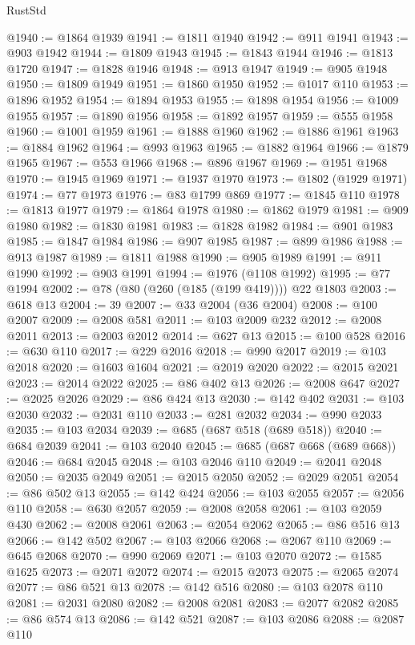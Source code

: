 \begin{lexlean}{RustStd}
\begin{coremodule}
@1940 := @1864 @1939
@1941 := @1811 @1940
@1942 := @911 @1941
@1943 := @903 @1942
@1944 := @1809 @1943
@1945 := @1843 @1944
@1946 := @1813 @1720
@1947 := @1828 @1946
@1948 := @913 @1947
@1949 := @905 @1948
@1950 := @1809 @1949
@1951 := @1860 @1950
@1952 := @1017 @110
@1953 := @1896 @1952
@1954 := @1894 @1953
@1955 := @1898 @1954
@1956 := @1009 @1955
@1957 := @1890 @1956
@1958 := @1892 @1957
@1959 := @555 @1958
@1960 := @1001 @1959
@1961 := @1888 @1960
@1962 := @1886 @1961
@1963 := @1884 @1962
@1964 := @993 @1963
@1965 := @1882 @1964
@1966 := @1879 @1965
@1967 := @553 @1966
@1968 := @896 @1967
@1969 := @1951 @1968
@1970 := @1945 @1969
@1971 := @1937 @1970
@1973 := @1802 (@1929 @1971)
@1974 := @77 @1973
@1976 := @83 @1799 @869
@1977 := @1845 @110
@1978 := @1813 @1977
@1979 := @1864 @1978
@1980 := @1862 @1979
@1981 := @909 @1980
@1982 := @1830 @1981
@1983 := @1828 @1982
@1984 := @901 @1983
@1985 := @1847 @1984
@1986 := @907 @1985
@1987 := @899 @1986
@1988 := @913 @1987
@1989 := @1811 @1988
@1990 := @905 @1989
@1991 := @911 @1990
@1992 := @903 @1991
@1994 := @1976 (@1108 @1992)
@1995 := @77 @1994
@2002 := @78 (@80 (@260 (@185 (@199 @419)))) @22 @1803
@2003 := @618 @13
@2004 := 39
@2007 := @33 @2004 (@36 @2004)
@2008 := @100 @2007
@2009 := @2008 @581
@2011 := @103 @2009 @232
@2012 := @2008 @2011
@2013 := @2003 @2012
@2014 := @627 @13
@2015 := @100 @528
@2016 := @630 @110
@2017 := @229 @2016
@2018 := @990 @2017
@2019 := @103 @2018
@2020 := @1603 @1604
@2021 := @2019 @2020
@2022 := @2015 @2021
@2023 := @2014 @2022
@2025 := @86 @402 @13
@2026 := @2008 @647
@2027 := @2025 @2026
@2029 := @86 @424 @13
@2030 := @142 @402
@2031 := @103 @2030
@2032 := @2031 @110
@2033 := @281 @2032
@2034 := @990 @2033
@2035 := @103 @2034
@2039 := @685 (@687 @518 (@689 @518))
@2040 := @684 @2039
@2041 := @103 @2040
@2045 := @685 (@687 @668 (@689 @668))
@2046 := @684 @2045
@2048 := @103 @2046 @110
@2049 := @2041 @2048
@2050 := @2035 @2049
@2051 := @2015 @2050
@2052 := @2029 @2051
@2054 := @86 @502 @13
@2055 := @142 @424
@2056 := @103 @2055
@2057 := @2056 @110
@2058 := @630 @2057
@2059 := @2008 @2058
@2061 := @103 @2059 @430
@2062 := @2008 @2061
@2063 := @2054 @2062
@2065 := @86 @516 @13
@2066 := @142 @502
@2067 := @103 @2066
@2068 := @2067 @110
@2069 := @645 @2068
@2070 := @990 @2069
@2071 := @103 @2070
@2072 := @1585 @1625
@2073 := @2071 @2072
@2074 := @2015 @2073
@2075 := @2065 @2074
@2077 := @86 @521 @13
@2078 := @142 @516
@2080 := @103 @2078 @110
@2081 := @2031 @2080
@2082 := @2008 @2081
@2083 := @2077 @2082
@2085 := @86 @574 @13
@2086 := @142 @521
@2087 := @103 @2086
@2088 := @2087 @110

\end{coremodule}
\end{lexlean}
